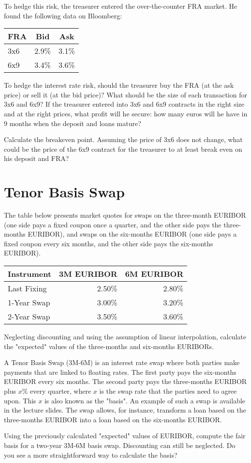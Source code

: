 \documentclass[a4paper,14pt]{extarticle}
\begin{document}
To hedge this risk, the treasurer entered the over-the-counter FRA market. He found the following data on Bloomberg:

\begin{table}[h]
\centering
\begin{tabular}{l|c|c}
FRA & Bid & Ask \\ \hline
3x6 & 2.9\% & 3.1\% \\ 
6x9 & 3.4\% & 3.6\% \\
\end{tabular}
\end{table}

To hedge the interest rate risk, should the treasurer buy the FRA (at the ask price) or sell it (at the bid price)? What should be the size of each transaction for 3x6 and 6x9? If the treasurer entered into 3x6 and 6x9 contracts in the right size and at the right prices, what profit will he secure: how many euros will he have in 9 months when the deposit and loans mature?

Calculate the breakeven point. Assuming the price of 3x6 does not change, what could be the price of the 6x9 contract for the treasurer to at least break even on his deposit and FRA?

\section{Tenor Basis Swap}

The table below presents market quotes for swaps on the three-month EURIBOR (one side pays a fixed coupon once a quarter, and the other side pays the three-months EURIBOR), and swaps on the six-months EURIBOR (one side pays a fixed coupon every six months, and the other side pays the six-months EURIBOR).

\begin{table}[h]
\centering
\begin{tabular}{l|r|r}
Instrument & 3M EURIBOR & 6M EURIBOR \\ \hline
Last Fixing & 2.50\% & 2.80\% \\
1-Year Swap & 3.00\% & 3.20\% \\
2-Year Swap & 3.50\% & 3.60\%
\end{tabular}
\end{table}

Neglecting discounting and using the assumption of linear interpolation, calculate the "expected" values of the three-months and six-months EURIBORs.

A Tenor Basis Swap (3M-6M) is an interest rate swap where both parties make payments that are linked to floating rates. The first party pays the six-months EURIBOR every six months. The second party pays the three-months EURIBOR plus $x\%$ every quarter, where $x$ is the swap rate that the parties need to agree upon. This $x$ is also known as the "basis". An example of such a swap is available in the lecture slides. The swap allows, for instance, transform a loan based on the three-months EURIBOR into a loan based on the six-months EURIBOR.

Using the previously calculated "expected" values of EURIBOR, compute the fair basis for a two-year 3M-6M basis swap. Discounting can still be neglected. Do you see a more straightforward way to calculate the basis?
\end{document}
